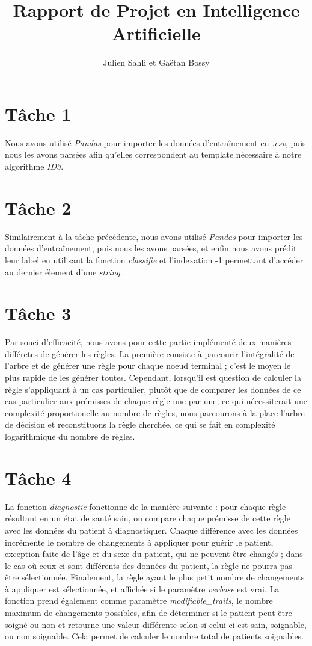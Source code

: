 \documentclass[a4paper,11pt,french]{article}
\title{Rapport de Projet en Intelligence Artificielle}
\author{Julien Sahli et Gaëtan Bossy}
\begin{document}
\maketitle
\section{Tâche 1}
Nous avons utilisé \emph{Pandas} pour importer les données d'entraînement en \emph{.csv}, puis nous les avons parsées afin qu'elles correspondent au template nécessaire à notre algorithme \emph{ID3}. %
\section{Tâche 2}
Similairement à la tâche précédente, nous avons utilisé \emph{Pandas} pour importer les données d'entraînement, puis nous les avons parsées, et enfin nous avons prédit leur label en utilisant la fonction \emph{classifie} et l'indexation -1 permettant d'accéder au dernier élement d'une \emph{string}.
\section{Tâche 3}
Par souci d'efficacité, nous avons pour cette partie implémenté deux manières différetes de générer les règles. La première consiste à parcourir l'intégralité de l'arbre et de générer une règle pour chaque noeud terminal ; c'est le moyen le plus rapide de les générer toutes. Cependant, lorsqu'il est question de calculer la règle s'appliquant à un cas particulier, plutôt que de comparer les données de ce cas particulier aux prémisses de chaque règle une par une, ce qui nécessiterait une complexité proportionelle au nombre de règles, nous parcourons à la place l'arbre de décision et reconstituons la règle cherchée, ce qui se fait en complexité logarithmique du nombre de règles.
\section{Tâche 4}
La fonction \emph{diagnostic} fonctionne de la manière suivante : pour chaque règle résultant en un état de santé sain, on compare chaque prémisse de cette règle avec les données du patient à diagnostiquer. Chaque différence avec les données incrémente le nombre de changements à appliquer pour guérir le patient, exception faite de l'âge et du sexe du patient, qui ne peuvent être changés ; dans le cas où ceux-ci sont différents des données du patient, la règle ne pourra pas être sélectionnée. Finalement, la règle ayant le plus petit nombre de changements à appliquer est sélectionnée, et affichée si le paramètre \emph{verbose} est vrai. La fonction prend également comme paramètre \emph{modifiable\_traits}, le nombre maximum de changements possibles, afin de déterminer si le patient peut être soigné ou non et retourne une valeur différente selon si celui-ci est sain, soignable, ou non soignable. Cela permet de calculer le nombre total de patients soignables.
\end{document}
